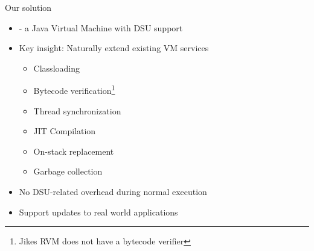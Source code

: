 % 


\begin{frame}{Our solution}%
\begin{itemize}
\item \DSU{} - a Java Virtual Machine with DSU support
\item Key insight: Naturally extend existing VM services
  \begin{itemize}
  \item Classloading
  \item Bytecode verification\footnote{Jikes RVM does not have a bytecode
  verifier}
  \item Thread synchronization
  \item JIT Compilation
  \item On-stack replacement
  \item Garbage collection
  \end{itemize}
\item No DSU-related overhead during normal execution
\item Support updates to real world applications
\end{itemize}
\end{frame}

